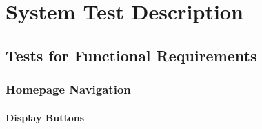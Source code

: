 \documentclass[11pt]{article}
\begin{document}
\newpage

\section{System Test Description}
	
\subsection{Tests for Functional Requirements}

\subsubsection{Homepage Navigation}
		
\paragraph{Display Buttons}
\end{document}
